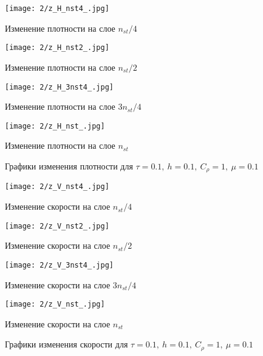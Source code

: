 \begin{figure}[h]
	\begin{minipage}[h]{0.47\linewidth}
		\centering
		\texttt{[image: 2/z\_H\_nst4\_.jpg]} 
		\caption{Изменение плотности на слое $n_{st} / 4$}
	\end{minipage}
	\hfill
	\begin{minipage}[h]{0.47\linewidth}
		\centering
		\texttt{[image: 2/z\_H\_nst2\_.jpg]} 
		\caption{Изменение плотности на слое $n_{st} / 2$}
	\end{minipage}
\end{figure}
\begin{figure}[h]
	\begin{minipage}[h]{0.47\linewidth}
		\centering
		\texttt{[image: 2/z\_H\_3nst4\_.jpg]} 
		\caption{Изменение плотности на слое $3n_{st} / 4$}
	\end{minipage}
	\hfill
	\begin{minipage}[h]{0.47\linewidth}
		\centering
		\texttt{[image: 2/z\_H\_nst\_.jpg]} 
		\caption{Изменение плотности на слое $n_{st}$}
	\end{minipage}
	\caption{Графики изменения плотности для $\tau = 0.1, \ h = 0.1, \ C_{\rho} = 1, \ \mu = 0.1$}
	\label{ris:experimentalcorrelationsignals}
\end{figure}

\begin{figure}[h]
	\begin{minipage}[h]{0.47\linewidth}
		\centering
		\texttt{[image: 2/z\_V\_nst4\_.jpg]} 
		\caption{Изменение скорости на слое $n_{st} / 4$}
	\end{minipage}
	\hfill
	\begin{minipage}[h]{0.47\linewidth}
		\centering
		\texttt{[image: 2/z\_V\_nst2\_.jpg]} 
		\caption{Изменение скорости на слое $n_{st} / 2$}
	\end{minipage}
	\vfill
	\begin{minipage}[h]{0.47\linewidth}
		\centering
		\texttt{[image: 2/z\_V\_3nst4\_.jpg]} 
		\caption{Изменение скорости на слое $3n_{st} / 4$}
	\end{minipage}
	\hfill
	\begin{minipage}[h]{0.47\linewidth}
		\centering
		\texttt{[image: 2/z\_V\_nst\_.jpg]} 
		\caption{Изменение скорости на слое $n_{st}$}
	\end{minipage}
	\caption{Графики изменения скорости для $\tau = 0.1, \ h = 0.1, \ C_{\rho} = 1, \ \mu = 0.1$}
	\label{ris:experimentalcorrelationsignals}
\end{figure}

